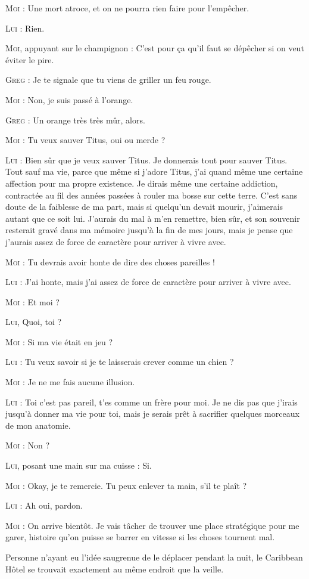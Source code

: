\begin{dialogue}
\textsc{Moi} : Une mort atroce, et on ne pourra rien faire pour l’empêcher.

\textsc{Lui} : Rien.

\textsc{Moi}, appuyant sur le champignon : C’est pour ça qu’il faut se dépêcher si on veut éviter le pire.

\textsc{Greg} : Je te signale que tu viens de griller un feu rouge.

\textsc{Moi} : Non, je suis passé à l’orange.

\textsc{Greg} : Un orange très très mûr, alors.

\textsc{Moi} : Tu veux sauver Titus, oui ou merde ?

\textsc{Lui} : Bien sûr que je veux sauver Titus. Je donnerais tout pour sauver Titus. Tout sauf ma vie, parce que même si j’adore Titus, j’ai quand même une certaine affection pour ma propre existence. Je dirais même une certaine addiction, contractée au fil des années passées à rouler ma bosse sur cette terre. C’est sans doute de la faiblesse de ma part, mais si quelqu’un devait mourir, j’aimerais autant que ce soit lui. J’aurais du mal à m’en remettre, bien sûr, et son souvenir resterait gravé dans ma mémoire jusqu’à la fin de mes jours, mais je pense que j’aurais assez de force de caractère pour arriver à vivre avec.

\textsc{Moi} : Tu devrais avoir honte de dire des choses pareilles !

\textsc{Lui} : J’ai honte, mais j’ai assez de force de caractère pour arriver à vivre avec.

\textsc{Moi} : Et moi ?

\textsc{Lui}, Quoi, toi ?

\textsc{Moi} : Si ma vie était en jeu ?

\textsc{Lui} : Tu veux savoir si je te laisserais crever comme un chien ?

\textsc{Moi} : Je ne me fais aucune illusion.

\textsc{Lui} : Toi c’est pas pareil, t’es comme un frère pour moi. Je ne dis pas que j’irais jusqu’à donner ma vie pour toi, mais je serais prêt à sacrifier quelques morceaux de mon anatomie.

\textsc{Moi} : Non ?

\textsc{Lui}, posant une main sur ma cuisse : Si.

\textsc{Moi} : Okay, je te remercie. Tu peux enlever ta main, s’il te plaît ?

\textsc{Lui} : Ah oui, pardon.

\textsc{Moi} : On arrive bientôt. Je vais tâcher de trouver une place stratégique pour me garer, histoire qu’on puisse se barrer en vitesse si les choses tournent mal.

\end{dialogue}

Personne n’ayant eu l’idée saugrenue de le déplacer pendant la nuit, le Caribbean Hôtel se trouvait exactement au même endroit que la veille.
